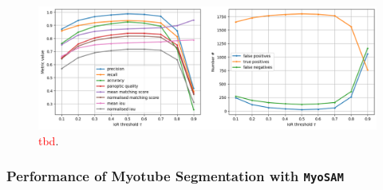 \begin{figure}
	\centering
	\includegraphics[width=\textwidth]{"images/quantitative_performance_stardist.png"}
	\caption[Quantitative performance \texttt{Stardist}]{\textcolor{red}{tbd}.}
	\label{figperfstardist}
\end{figure} 


\subsubsection{Performance of Myotube Segmentation with \texttt{MyoSAM}}


